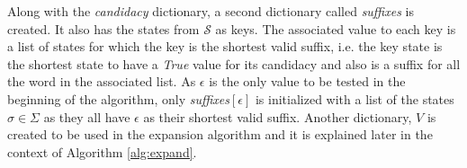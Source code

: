 {%
 
 
 Along with the \textit{candidacy} dictionary, a second dictionary called \textit{suffixes} is created. It also has the states from $\mathcal{S}$ as keys. The associated value to each key is a list of states for which the key is the shortest valid suffix, i.e. the key state is the shortest state to have a \textit{True} value for its candidacy and also is a suffix for all the word in the associated list. As $\epsilon$ is the only value to be tested in the beginning of the algorithm, only \textit{suffixes}$[\epsilon]$ is initialized with a list of the states  $\sigma \in \Sigma$ as they all have $\epsilon$ as their shortest valid suffix. Another dictionary, $V$ is created to be used in the expansion algorithm and it is explained later in the context of Algorithm \ref{alg:expand}.
 
 
}
